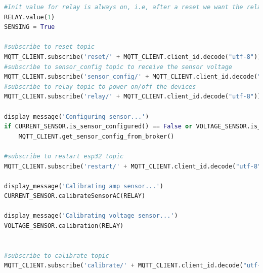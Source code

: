 \begin{titlepage}
\begin{lstlisting}[language=python]
#Init value for relay is always on, i.e, after a reset we want the relay to be on
RELAY.value(1)
SENSING = True

#subscribe to reset topic
MQTT_CLIENT.subscribe('reset/' + MQTT_CLIENT.client_id.decode("utf-8"))
#subscribe to sensor_config topic to receive the sensor voltage
MQTT_CLIENT.subscribe('sensor_config/' + MQTT_CLIENT.client_id.decode("utf-8"))
#subscribe to relay topic to power on/off the devices
MQTT_CLIENT.subscribe('relay/' + MQTT_CLIENT.client_id.decode("utf-8"))

display_message('Configuring sensor...')
if CURRENT_SENSOR.is_sensor_configured() == False or VOLTAGE_SENSOR.is_sensor_configured() == False:
	MQTT_CLIENT.get_sensor_config_from_broker()

#subscribe to restart esp32 topic
MQTT_CLIENT.subscribe('restart/' + MQTT_CLIENT.client_id.decode("utf-8"))

display_message('Calibrating amp sensor...')
CURRENT_SENSOR.calibrateSensorAC(RELAY)

display_message('Calibrating voltage sensor...')
VOLTAGE_SENSOR.calibration(RELAY)


#subscribe to calibrate topic
MQTT_CLIENT.subscribe('calibrate/' + MQTT_CLIENT.client_id.decode("utf-8"))
\end{lstlisting}


\end{titlepage}
